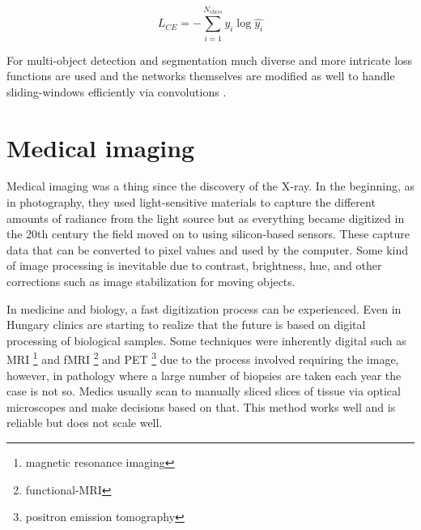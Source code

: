 \documentclass[a4paper,12pt]{article}
\begin{document}
\begin{equation}
    L_{CE} = - \sum_{i = 1}^{N_{class}} y_{i}\log\hat{y_{i}}
\end{equation}

\vspace{4mm}

\par For multi-object detection and segmentation much diverse and more intricate loss functions are used and the networks themselves \cite{ren2015faster} are modified as well to handle sliding-windows efficiently via convolutions \cite{redmon2016you}.

\vspace{7mm}

\section{Medical imaging}

\vspace{7mm}

\par Medical imaging was a thing since the discovery of the X-ray. In the beginning, as in photography, they used light-sensitive materials to capture the different amounts of radiance from the light source but as everything became digitized in the 20th century the field moved on to using silicon-based sensors. These capture data that can be converted to pixel values and used by the computer. Some kind of image processing is inevitable due to contrast, brightness, hue, and other corrections such as image stabilization for moving objects.

\vspace{4mm}

\par In medicine and biology, a fast digitization process can be experienced. Even in Hungary clinics are starting to realize that the future is based on digital processing of biological samples. Some techniques were inherently digital such as MRI \footnote{magnetic resonance imaging} and fMRI \footnote{functional-MRI} and PET \footnote{positron emission tomography} due to the process involved requiring the image, however, in pathology where a large number of biopsies are taken each year the case is not so. Medics usually scan to manually sliced slices of tissue via optical microscopes and make decisions based on that. This method works well and is reliable but does not scale well. 

\vspace{4mm}
\end{document}
